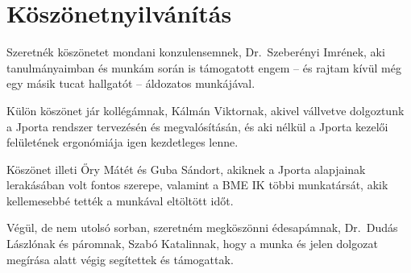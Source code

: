 \chapter*{Köszönetnyilvánítás}

Szeretnék köszönetet mondani konzulensemnek, Dr.~Szeberényi Imrének, aki tanulmányaimban és munkám során is támogatott engem -- és rajtam kívül még egy másik tucat hallgatót -- áldozatos munkájával.  

Külön köszönet jár kollégámnak, Kálmán Viktornak, akivel vállvetve dolgoztunk a Jporta rendszer tervezésén és megvalósításán, és aki nélkül a Jporta kezelői felületének ergonómiája igen kezdetleges lenne.

Köszönet illeti Őry Mátét és Guba Sándort, akiknek a Jporta alapjainak lerakásában volt fontos szerepe, valamint a BME IK többi munkatársát, akik kellemesebbé tették a munkával eltöltött időt.

Végül, de nem utolsó sorban, szeretném megköszönni édesapámnak, Dr.~Dudás Lászlónak és páromnak, Szabó Katalinnak, hogy a munka és jelen dolgozat megírása alatt végig segítettek és támogattak. 